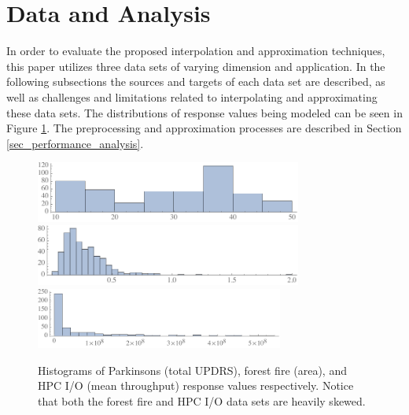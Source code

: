 \documentclass[smallextended]{svjour3}       %
\begin{document}



\section{Data and Analysis}
In order to evaluate the proposed interpolation and approximation techniques, this paper utilizes three data sets of varying dimension and application. In the following subsections the sources and targets of each data set are described, as well as challenges and limitations related to interpolating and approximating these data sets. The distributions of response values being modeled can be seen in Figure \ref{fig_response_hists}. The preprocessing and approximation processes are described in Section \ref{sec_performance_analysis}.

\begin{figure}
  \includegraphics[width=.5\textwidth,height=2cm]{Figures/p-hist.pdf}
  \includegraphics[width=.5\textwidth,height=2cm]{Figures/f-hist.pdf}
  \includegraphics[width=.5\textwidth,height=2cm]{Figures/h-hist.pdf}
  \caption{Histograms of Parkinsons (total UPDRS), forest fire (area), and HPC I/O (mean throughput) response values respectively. Notice that both the forest fire and HPC I/O data sets are heavily skewed.
  \vspace{-.5cm}}
  \label{fig_response_hists}
\end{figure}
\end{document}
